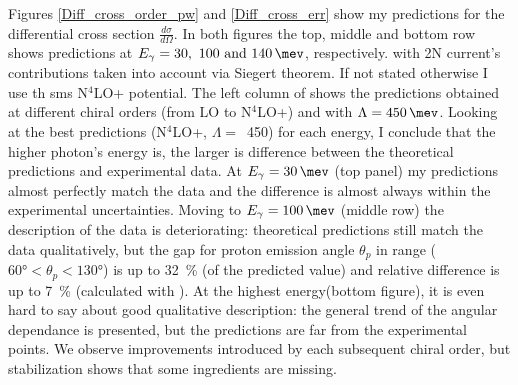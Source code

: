         
    Figures \ref{Diff_cross_order_pw} and \ref{Diff_cross_err} show my predictions 
    for the differential cross section
    $\frac{d\sigma}{d\Omega}$.
    In both figures the top, middle and bottom row shows predictions at 
    $E_\gamma = \SIlist[list-units = single]{30;100;140}{\mev}$, respectively.
    with 2N current's contributions taken into account via Siegert theorem.
    If not stated otherwise I use th \gls{sms} N$^4$LO+ potential.
    The left column of  shows the predictions obtained at 
    different chiral orders (from LO to N$^4$LO+) and with $\Lambda=\SI{450}{\mev}$.
    Looking at the best predictions (N$^4$LO+, $\Lambda=$~\SI{450}{\mev}) for each
    energy, I
    conclude that the higher photon's energy is, the larger is 
    difference between the theoretical predictions and experimental 
    data. At $E_\gamma = \SI{30}{\mev}$ (top panel) my predictions
    almost perfectly match the data and the difference is almost always
    within the experimental uncertainties. 
    Moving to  $E_\gamma=\SI{100}{\mev}$ (middle row)
    the description of the data is deteriorating: theoretical
    predictions still match the data qualitatively, but
    the gap for proton emission angle $\theta_p$ in range ($\ang{60} < \theta_p < \ang{130}$) 
    is up to \SI{32}{\percent} (of the predicted value) and relative difference is up to
    \SI{7}{\percent} (calculated with ).
    At the highest energy(bottom figure), it is even hard to say about 
    good qualitative description: the general trend of the
    angular dependance is presented, but the predictions are 
    far from the experimental points.
    We observe improvements introduced by each subsequent chiral order, but 
    stabilization shows that some ingredients are missing.

